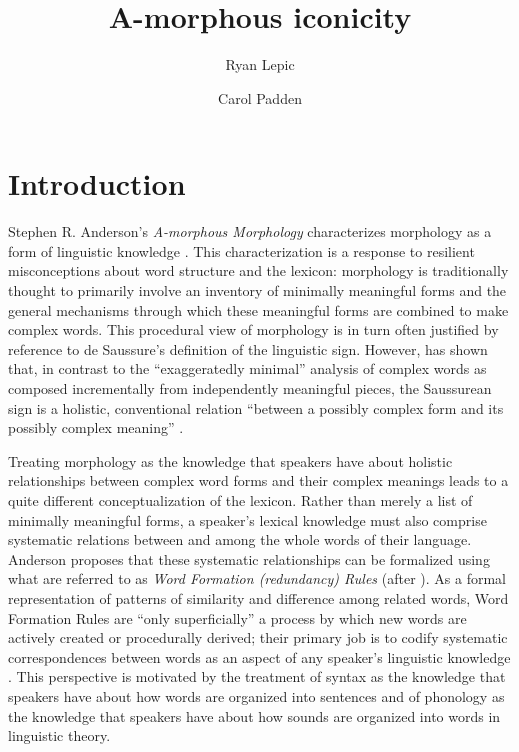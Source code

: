 \documentclass[output=paper,
modfonts
]{LSP/langsci}
\title{A-morphous iconicity}
\author{%
Ryan Lepic\affiliation{University of California, San Diego}\and
Carol Padden\affiliation{University of California, San Diego}
}
\begin{document}
\maketitle

\section{Introduction}

Stephen R. Anderson's \textit{A-morphous Morphology} characterizes morphology as a form of linguistic knowledge \citep[181]{anderson1992}. This characterization is a response to resilient misconceptions about word structure and the lexicon: morphology is traditionally thought to primarily involve an inventory of minimally meaningful forms and the general mechanisms through which these meaningful forms are combined to make complex words. This procedural view of morphology is in turn often justified by reference to de Saussure's definition of the linguistic sign. However, \citet{anderson1985,anderson1992,Andersoninpress} has shown that, in contrast to the ``exaggeratedly minimal'' \citep[326]{anderson1992} analysis of complex words as composed incrementally from independently meaningful pieces, the Saussurean sign is a holistic, conventional relation ``between a possibly complex form and its possibly complex meaning'' \citep[193]{anderson1992}.

  Treating morphology as the knowledge that speakers have about holistic relationships between complex word forms and their complex meanings leads to a quite different conceptualization of the lexicon. Rather than merely a list of minimally meaningful forms, a speaker's lexical knowledge must also comprise systematic relations between and among the whole words of their language. Anderson proposes that these systematic relationships can be formalized using what are referred to as \textit{Word Formation (redundancy) Rules} (after \citealt{Jackendoff1975}). As a formal representation of patterns of similarity and difference among related words, Word Formation Rules are ``only superficially'' a process by which new words are actively created or procedurally derived; their primary job is to codify systematic correspondences between words as an aspect of any speaker's linguistic knowledge \citep[186]{anderson1992}. This perspective is motivated by the treatment of syntax as the knowledge that speakers have about how words are organized into sentences and of phonology as the knowledge that speakers have about how sounds are organized into words in linguistic theory.
\end{document}
